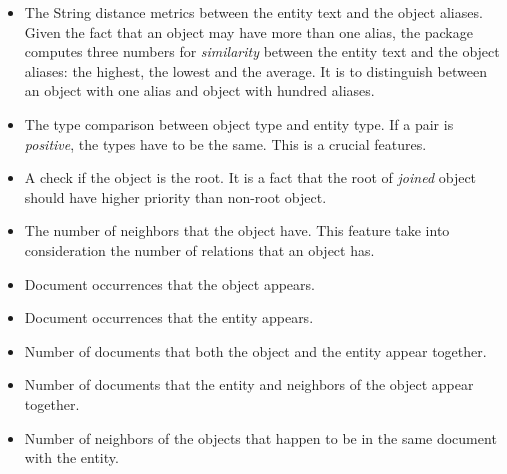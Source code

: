 \begin{itemize}
\item The String distance metrics between the entity text and the object aliases. Given 
the fact that an object may have more than one alias, the package computes three numbers for 
\textit{similarity} between the entity text and the object aliases: the highest, the lowest and
the average. It is to distinguish between an object with one alias and object with hundred aliases.
\item The type comparison between object type and entity type. If a pair is \textit{positive},
the types have to be the same. This is a crucial features. 
\item A check if the object is the root. It is a fact that the root of \textit{joined} object 
should have higher priority than non-root object.
\item The number of neighbors that the object have. This feature take into consideration the number 
of relations that an object has.
\item Document occurrences that the object appears. 
\item Document occurrences that the entity appears.
\item Number of documents that both the object and the entity appear together.
\item Number of documents that the entity and neighbors of the object appear together.
\item Number of neighbors of the objects that happen to be in the same document with the entity.
\end{itemize}


